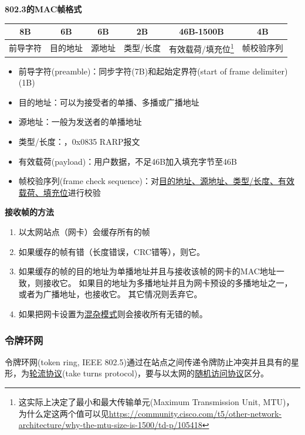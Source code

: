 \myhline
\textbf{802.3的MAC帧格式}
\begin{center}
\begin{tabular}{|c|c|c|c|c|c|}\hline
8B & 6B & 6B & 2B & 46B-1500B & 4B\\\hline
前导字符 & 目的地址 & 源地址 & 类型/长度 & 有效载荷/填充位\protect\footnote{这实际上决定了最小和最大传输单元(Maximum Transmission Unit, MTU)，为什么定这两个值可以见\url{https://community.cisco.com/t5/other-network-architecture/why-the-mtu-size-is-1500/td-p/105418}} & 帧校验序列\\\hline
\end{tabular}
\end{center}
\begin{itemize}
\item 前导字符(preamble)：同步字符(7B)和起始定界符(start of frame delimiter)(1B)
\item 目的地址：可以为接受者的单播、多播或广播地址
\item 源地址：一般为发送者的单播地址
\item 类型/长度：，0x0835 RARP报文
\item 有效载荷(payload)：用户数据，不足46B加入填充字节至46B
\item 帧校验序列(frame check sequence)：对\underline{目的地址、源地址、类型/长度、有效载荷、填充位}进行校验
\end{itemize}

\myhline
\textbf{接收帧的方法}
\begin{enumerate}
	\item 以太网站点（网卡）会缓存所有的帧
	\item 如果缓存的帧有错（长度错误，CRC错等），则它。
	\item 如果缓存的帧的目的地址为单播地址并且与接收该帧的网卡的MAC地址一致，则接收它。
	如果目的地址为多播地址并且为网卡预设的多播地址之一，或者为广播地址，也接收它。
	其它情况则丢弃它。
	\item 如果把网卡设置为\underline{混杂模式}则会接收所有无错的帧。
\end{enumerate}

\subsubsection{令牌环网}
令牌环网(token ring, IEEE 802.5)通过在站点之间传递令牌防止冲突并且具有的星形，为\underline{轮流协议}(take turns protocol)，要与以太网的\underline{随机访问协议}区分。

